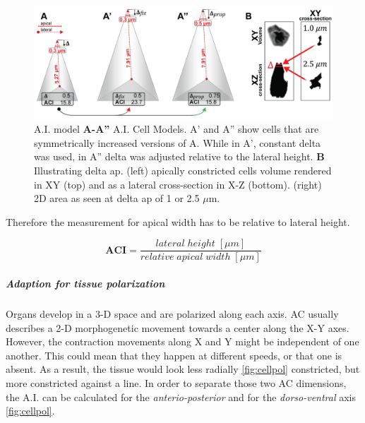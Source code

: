 \documentclass[11pt,singlespacinge,twoside]{reedthesis} %
\begin{document}
\begin{figure}

{\centering \includegraphics[width=0.75\linewidth]{figures/summary/aci_fig-01} 

}

\caption[ACI Cell Models]{A.I. model \textbf{A-A''} A.I. Cell Models. A' and A'' show cells that are symmetrically increased versions of A. While in A', constant delta was used, in A'' delta was adjusted relative to the lateral height. \textbf{B} Illustrating delta ap. (left) apically constricted cells volume rendered in XY (top) and as a lateral cross-section in X-Z (bottom). (right) 2D area as seen at delta ap of 1 or 2.5 \(\mu\)m.}\label{fig:ACICells}
\end{figure}
Therefore the measurement for apical width has to be relative to lateral height.

\[\mathbf{ACI} = \frac{lateral\;height\;[\mu m]}{relative\;apical\;width\;[\mu m]}\]

\hypertarget{ACI-pol}{%
\subparagraph{Adaption for tissue polarization}\label{ACI-pol}}

Organs develop in a 3-D space and are polarized along each axis. AC usually describes a 2-D morphogenetic movement towards a center along the X-Y axes. However, the contraction movements along X and Y might be independent of one another. This could mean that they happen at different speeds, or that one is absent. As a result, the tissue would look less radially \ref{fig:cellpol} constricted, but more constricted against a line. In order to separate those two AC dimensions, the A.I. can be calculated for the \emph{anterio-posterior} and for the \emph{dorso-ventral} axis \ref{fig:cellpol}.
\end{document}
